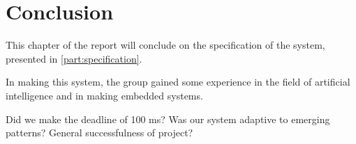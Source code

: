 \chapter{Conclusion}

This chapter of the report will conclude on the specification of the system, presented in \cref{part:specification}.

In making this system, the group gained some experience in the field of artificial intelligence and in making embedded systems.

Did we make the deadline of 100 ms?
Was our system adaptive to emerging patterns?
General successfulness of project?
